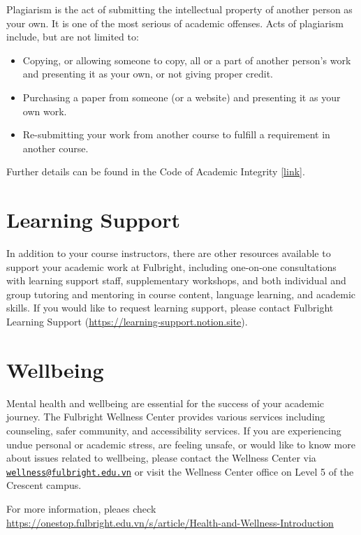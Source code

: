 \documentclass[
  openany]{book}
\begin{document}
Plagiarism is the act of submitting the intellectual property of another person as your own. It is one of the most serious of academic offenses. Acts of plagiarism include, but are not limited to:

\begin{itemize}
\item
  Copying, or allowing someone to copy, all or a part of another person's work and presenting it as your own, or not giving proper credit.
\item
  Purchasing a paper from someone (or a website) and presenting it as your own work.
\item
  Re-submitting your work from another course to fulfill a requirement in another course.
\end{itemize}

Further details can be found in the Code of Academic Integrity {[}\href{https://fulbright.edu.vn/articles/Code\%20of\%20Academic\%20Integrity/Code\%20of\%20Academic\%20Integrity_\%20Excom\%20Endorsed.pdf}{link}{]}.

\section*{Learning Support}\label{learning-support}

In addition to your course instructors, there are other resources available to support your
academic work at Fulbright, including one-on-one consultations with learning support staff,
supplementary workshops, and both individual and group tutoring and mentoring in course
content, language learning, and academic skills. If you would like to request learning support,
please contact Fulbright Learning Support (\url{https://learning-support.notion.site}).

\section*{Wellbeing}\label{wellbeing}

Mental health and wellbeing are essential for the success of your academic journey. The
Fulbright Wellness Center provides various services including counseling, safer community,
and accessibility services. If you are experiencing undue personal or academic stress, are
feeling unsafe, or would like to know more about issues related to wellbeing, please contact
the Wellness Center via \href{mailto:wellness@fulbright.edu.vn}{\nolinkurl{wellness@fulbright.edu.vn}} or visit the Wellness Center office on
Level 5 of the Crescent campus.

For more information, pleaes check
\url{https://onestop.fulbright.edu.vn/s/article/Health-and-Wellness-Introduction}
\end{document}
